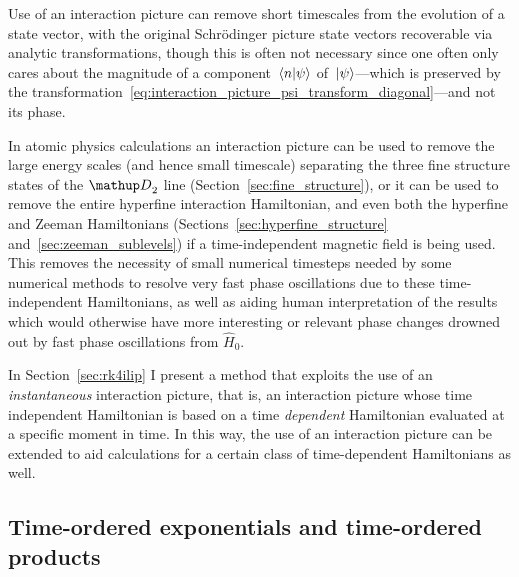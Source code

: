 Use of an interaction picture can remove short timescales from the evolution of a state vector, with the original Schr\"odinger picture state vectors recoverable via analytic transformations, though this is often not necessary since one often only cares about the magnitude of a component $\braket{n}{\psi}$ of $\ket\psi$---which is preserved by the transformation~\eqref{eq:interaction_picture_psi_transform_diagonal}---and not its phase.

In atomic physics calculations an interaction picture can be used to remove the large energy scales (and hence small timescale) separating the three fine structure states of the $\up{D}_2$ line (Section~\ref{sec:fine_structure}), or it can be used to remove the entire hyperfine interaction Hamiltonian, and even both the hyperfine and Zeeman Hamiltonians (Sections~\ref{sec:hyperfine_structure} and~\ref{sec:zeeman_sublevels}) if a time-independent magnetic field is being used. This removes the necessity of small numerical timesteps needed by some numerical methods to resolve very fast phase oscillations due to these time-independent Hamiltonians, as well as aiding human interpretation of the results which would otherwise have more interesting or relevant phase changes drowned out by fast phase oscillations from $\hat H_0$.

In Section~\ref{sec:rk4ilip} I present a method that exploits the use of an \emph{instantaneous} interaction picture, that is, an interaction picture whose time independent Hamiltonian is based on a time \emph{dependent} Hamiltonian evaluated at a specific moment in time. In this way, the use of an interaction picture can be extended to aid calculations for a certain class of time-dependent Hamiltonians as well.

\subsection{Time-ordered exponentials and time-ordered products}\label{sec:time_ordered_products}

